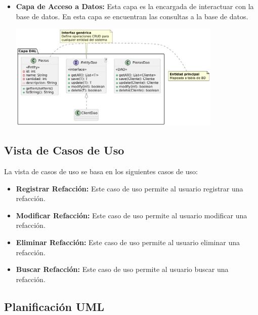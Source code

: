 \begin{itemize}
\begin{center}
    \end{center}
    \item \textbf{Capa de Acceso a Datos:} Esta capa es la encargada de interactuar con la base de datos. 
    En esta capa se encuentran las consultas a la base de datos.
    \begin{center}
        \includegraphics[width=0.8\textwidth]{imag/ImagenDiagramaUmlCapaAccesoDatos.png}
    \end{center}
\end{itemize}

\subsection*{Vista de Casos de Uso}

    La vista de casos de uso se basa en los siguientes casos de uso:
    \begin{itemize}
        \item \textbf{Registrar Refacción:} Este caso de uso permite al usuario registrar una refacción.
        \item \textbf{Modificar Refacción:} Este caso de uso permite al usuario modificar una refacción.
        \item \textbf{Eliminar Refacción:} Este caso de uso permite al usuario eliminar una refacción.
        \item \textbf{Buscar Refacción:} Este caso de uso permite al usuario buscar una refacción.
    \end{itemize}
\subsection*{Planificación UML}
\centering
